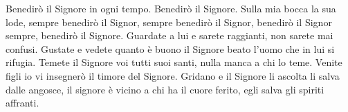 \beginchorus
Benedirò il Signore in ogni tempo.
Benedirò il Signore. 
Sulla mia bocca la sua lode,
sempre benedirò il Signor,
sempre benedirò il Signor,
benedirò il Signor sempre,
benedirò il Signore.
\endchorus
\beginverse
Guardate a lui e sarete raggianti,
non sarete mai confusi.
Gustate e vedete quanto è buono il Signore
beato l'uomo che in lui si rifugia.
Temete il Signore voi tutti suoi santi,
nulla manca a chi lo teme.
Venite figli io vi insegnerò
il timore del Signore.
Gridano e il Signore li ascolta
li salva dalle angosce,
il signore è vicino a chi ha il cuore ferito,
egli salva gli spiriti affranti.
\endverse
\endsong
